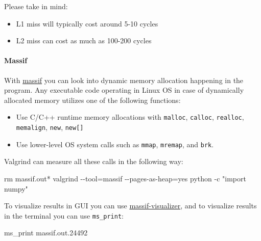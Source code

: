 \documentclass[
]{article}
\newenvironment{Shaded}{}{}
\newcommand{\AttributeTok}[1]{\textcolor[rgb]{0.49,0.56,0.16}{#1}}
\newcommand{\ExtensionTok}[1]{#1}
\newcommand{\FunctionTok}[1]{\textcolor[rgb]{0.02,0.16,0.49}{#1}}
\newcommand{\NormalTok}[1]{#1}
\newcommand{\OperatorTok}[1]{\textcolor[rgb]{0.40,0.40,0.40}{#1}}
\newcommand{\PreprocessorTok}[1]{\textcolor[rgb]{0.74,0.48,0.00}{#1}}
\newcommand{\StringTok}[1]{\textcolor[rgb]{0.25,0.44,0.63}{#1}}
\begin{document}
Please take in mind:

\begin{itemize}
\item
  L1 miss will typically cost around 5-10 cycles
\item
  L2 miss can cost as much as 100-200 cycles
\end{itemize}

\hypertarget{massif}{%
\paragraph{Massif}\label{massif}}

With \href{https://valgrind.org/docs/manual/ms-manual.html}{massif} you
can look into dynamic memory allocation happening in the program. Any
executable code operating in Linux OS in case of dynamically allocated
memory utilizes one of the following functions:

\begin{itemize}
\item
  Use C/C++ runtime memory allocations with \texttt{malloc},
  \texttt{calloc}, \texttt{realloc}, \texttt{memalign}, \texttt{new},
  \texttt{new{[}{]}}
\item
  Use lower-level OS system calls such as \texttt{mmap},
  \texttt{mremap}, and \texttt{brk}.
\end{itemize}

Valgrind can measure all these calls in the following way:

\begin{Shaded}
\begin{Highlighting}[]
\FunctionTok{rm}\NormalTok{ massif.out}\PreprocessorTok{*}
\FunctionTok{valgrind} \AttributeTok{{-}{-}tool}\OperatorTok{=}\NormalTok{massif }\AttributeTok{{-}{-}pages{-}as{-}heap}\OperatorTok{=}\NormalTok{yes python }\AttributeTok{{-}c} \StringTok{"import numpy"}
\end{Highlighting}
\end{Shaded}

To visualize results in GUI you can use
\href{https://github.com/KDE/massif-visualizer}{massif-visualizer}, and
to visualize results in the terminal you can use \texttt{ms\_print}:

\begin{Shaded}
\begin{Highlighting}[]
\ExtensionTok{ms\_print}\NormalTok{ massif.out.24492}
\end{Highlighting}
\end{Shaded}
\end{document}
